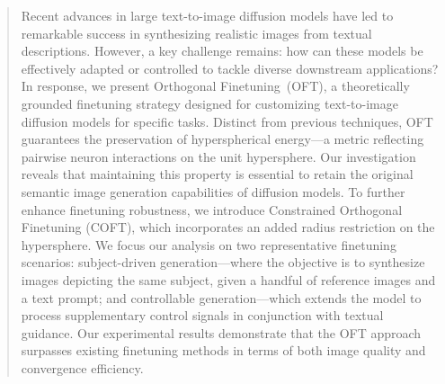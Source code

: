\begin{abstract}
Recent advances in large text-to-image diffusion models have led to remarkable success in synthesizing realistic images from textual descriptions. However, a key challenge remains: how can these models be effectively adapted or controlled to tackle diverse downstream applications? In response, we present Orthogonal Finetuning~(OFT), a theoretically grounded finetuning strategy designed for customizing text-to-image diffusion models for specific tasks. Distinct from previous techniques, OFT guarantees the preservation of hyperspherical energy—a metric reflecting pairwise neuron interactions on the unit hypersphere. Our investigation reveals that maintaining this property is essential to retain the original semantic image generation capabilities of diffusion models. To further enhance finetuning robustness, we introduce Constrained Orthogonal Finetuning (COFT), which incorporates an added radius restriction on the hypersphere. We focus our analysis on two representative finetuning scenarios: subject-driven generation—where the objective is to synthesize images depicting the same subject, given a handful of reference images and a text prompt; and controllable generation—which extends the model to process supplementary control signals in conjunction with textual guidance. Our experimental results demonstrate that the OFT approach surpasses existing finetuning methods in terms of both image quality and convergence efficiency.
\end{abstract}

